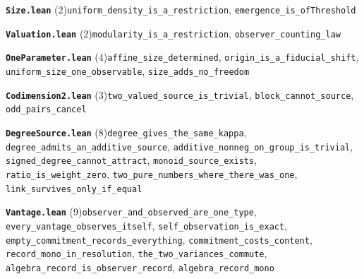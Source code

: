 \documentclass[11pt,a4paper]{article}
\theoremstyle{sudef}
\begin{document}
\noindent\textbf{\texttt{Size.lean}} (2)\quad \texttt{uniform\_\allowbreak density\_\allowbreak is\_\allowbreak a\_\allowbreak restriction}, \texttt{emergence\_\allowbreak is\_\allowbreak ofThreshold}\par\smallskip
\noindent\textbf{\texttt{Valuation.lean}} (2)\quad \texttt{modularity\_\allowbreak is\_\allowbreak a\_\allowbreak restriction}, \texttt{observer\_\allowbreak counting\_\allowbreak law}\par\smallskip
\noindent\textbf{\texttt{OneParameter.lean}} (4)\quad \texttt{affine\_\allowbreak size\_\allowbreak determined}, \texttt{origin\_\allowbreak is\_\allowbreak a\_\allowbreak fiducial\_\allowbreak shift}, \texttt{uniform\_\allowbreak size\_\allowbreak one\_\allowbreak observable}, \texttt{size\_\allowbreak adds\_\allowbreak no\_\allowbreak freedom}\par\smallskip
\noindent\textbf{\texttt{Codimension2.lean}} (3)\quad \texttt{two\_\allowbreak valued\_\allowbreak source\_\allowbreak is\_\allowbreak trivial}, \texttt{block\_\allowbreak cannot\_\allowbreak source}, \texttt{odd\_\allowbreak pairs\_\allowbreak cancel}\par\smallskip
\noindent\textbf{\texttt{DegreeSource.lean}} (8)\quad \texttt{degree\_\allowbreak gives\_\allowbreak the\_\allowbreak same\_\allowbreak kappa}, \texttt{degree\_\allowbreak admits\_\allowbreak an\_\allowbreak additive\_\allowbreak source}, \texttt{additive\_\allowbreak nonneg\_\allowbreak on\_\allowbreak group\_\allowbreak is\_\allowbreak trivial}, \texttt{signed\_\allowbreak degree\_\allowbreak cannot\_\allowbreak attract}, \texttt{monoid\_\allowbreak source\_\allowbreak exists}, \texttt{ratio\_\allowbreak is\_\allowbreak weight\_\allowbreak zero}, \texttt{two\_\allowbreak pure\_\allowbreak numbers\_\allowbreak where\_\allowbreak there\_\allowbreak was\_\allowbreak one}, \texttt{link\_\allowbreak survives\_\allowbreak only\_\allowbreak if\_\allowbreak equal}\par\smallskip
\noindent\textbf{\texttt{Vantage.lean}} (9)\quad \texttt{observer\_\allowbreak and\_\allowbreak observed\_\allowbreak are\_\allowbreak one\_\allowbreak type}, \texttt{every\_\allowbreak vantage\_\allowbreak observes\_\allowbreak itself}, \texttt{self\_\allowbreak observation\_\allowbreak is\_\allowbreak exact}, \texttt{empty\_\allowbreak commitment\_\allowbreak records\_\allowbreak everything}, \texttt{commitment\_\allowbreak costs\_\allowbreak content}, \texttt{record\_\allowbreak mono\_\allowbreak in\_\allowbreak resolution}, \texttt{the\_\allowbreak two\_\allowbreak variances\_\allowbreak commute}, \texttt{algebra\_\allowbreak record\_\allowbreak is\_\allowbreak observer\_\allowbreak record}, \texttt{algebra\_\allowbreak record\_\allowbreak mono}\par\smallskip
\end{document}
